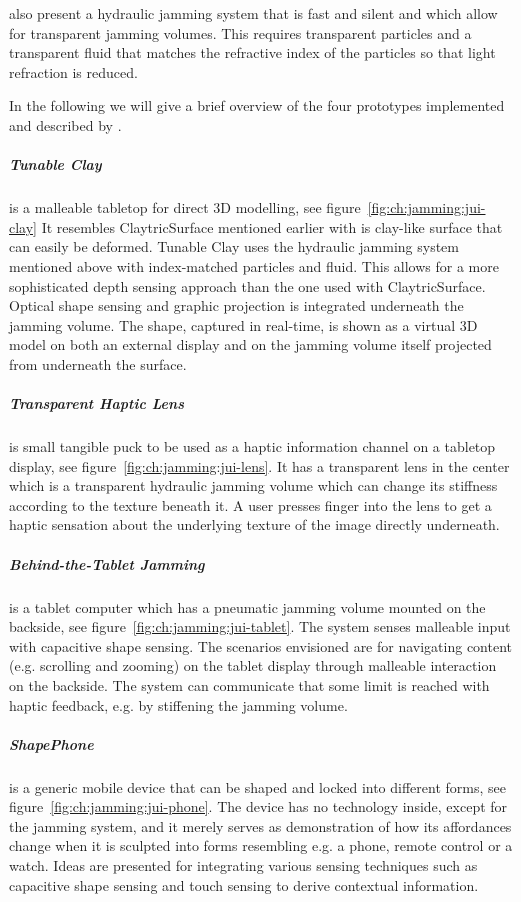 \citet{follmer2012jamming} also present a hydraulic jamming system that is fast and silent and which allow for transparent jamming volumes. 
This requires transparent particles and a transparent fluid that matches the refractive index of the particles so that light refraction is reduced. 


In the following we will give a brief overview of the four prototypes implemented and described by \citet{follmer2012jamming}.

\subparagraph{Tunable Clay} is a malleable tabletop for direct 3D modelling, see figure~\ref{fig:ch:jamming:jui-clay}
It resembles ClaytricSurface \citep{matoba2012claytricsurface} mentioned earlier with is clay-like surface that can easily be deformed.
Tunable Clay uses the hydraulic jamming system mentioned above with index-matched particles and fluid.
This allows for a more sophisticated depth sensing approach than the one used with ClaytricSurface.
Optical shape sensing and graphic projection is integrated underneath the jamming volume.
The shape, captured in real-time, is shown as a virtual 3D model on both an external display and on the jamming volume itself projected from underneath the surface.

\subparagraph{Transparent Haptic Lens} is small tangible puck to be used as a haptic information channel on a tabletop display, see figure~\ref{fig:ch:jamming:jui-lens}.
It has a transparent lens in the center which is a transparent hydraulic jamming volume which can change its stiffness according to the texture beneath it.
A user presses  finger into the lens to get a haptic sensation about the underlying texture of the image directly underneath. 

\subparagraph{Behind-the-Tablet Jamming} is a tablet computer which has a pneumatic jamming volume mounted on the backside, see figure~\ref{fig:ch:jamming:jui-tablet}.
The system senses malleable input with capacitive shape sensing.
The scenarios envisioned are for navigating content (e.g. scrolling and zooming) on the tablet display through malleable interaction on the backside. 
The system can communicate that some limit is reached with haptic feedback, 
e.g. by stiffening the jamming volume.

\subparagraph{ShapePhone} is a generic mobile device that can be shaped and locked into different forms, see figure~\ref{fig:ch:jamming:jui-phone}.
The device has no technology inside, except for the jamming system, and it merely serves as demonstration of how its affordances change when it is sculpted into forms resembling e.g. a phone, remote control or a watch.
Ideas are presented for integrating various sensing techniques such as capacitive shape sensing and touch sensing to derive contextual information.

